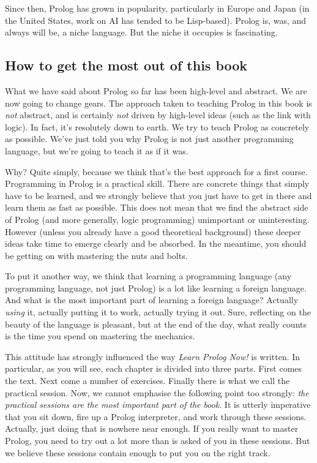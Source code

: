 Since then, Prolog has grown in popularity, particularly in Europe and
Japan (in the United States, work on AI has tended to be Lisp-based).
Prolog is, was, and always will be, a niche language. But the niche it
occupies is fascinating.

\subsection*{How to get the most out of this book}

What we have said about Prolog so far has been high-level and
abstract. We are now going to change gears.  The approach taken to
teaching Prolog in this book is \textit{not} abstract, and is
certainly \textit{not} driven by high-level ideas (such as the link
with logic). In fact, it's resolutely down to earth. We try to teach
Prolog as concretely as possible. We've just told you why Prolog is
not just another programming language, but we're going to teach it as
if it was.

Why? Quite simply, because we think that's the best approach for a
first course.  Programming in Prolog is a practical skill. There are
concrete things that simply have to be learned, and we strongly
believe that you just have to get in there and learn them as fast as
possible. This does not mean that we find the abstract side of Prolog
(and more generally, logic programming) unimportant or
uninteresting. However (unless you already have a good theoretical
background) these deeper ideas take time to emerge clearly and be
absorbed. In the meantime, you should be getting on with mastering the
nuts and bolts.

To put it another way, we think that learning a programming language
(any programming language, not just Prolog) is a lot like learning a
foreign language. And what is the most important part of learning a
foreign language? Actually \textit{using} it, actually putting it to
work, actually trying it out. Sure, reflecting on the beauty of the
language is pleasant, but at the end of the day, what really counts is
the time you spend on mastering the mechanics.

This attitude has strongly influenced the way \textit{Learn Prolog
  Now!}  is written. In particular, as you will see, each chapter is
  divided into three parts. First comes the text. Next come a number
  of exercises. Finally there is what we call the practical session.
  Now, we cannot emphasise the following point too strongly:
  \textit{the practical sessions are the most important part of the
  book}.  It is utterly imperative that you sit down, fire up a Prolog
  interpreter, and work through these sessions. Actually, just doing
  that is nowhere near enough. If you really want to master Prolog,
  you need to try out a lot more than is asked of you in these
  sessions. But we believe these sessions contain enough to put you on
  the right track.

